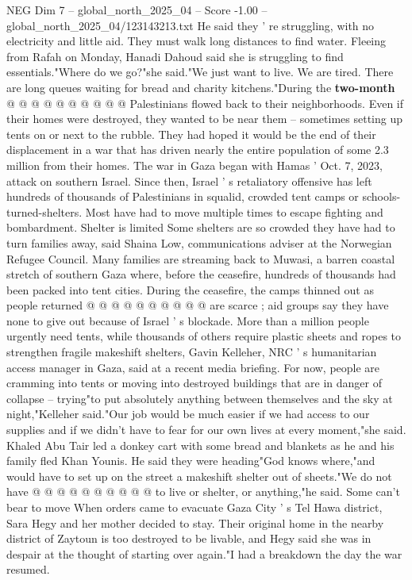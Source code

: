 \begin{textsample}{NEG Dim 7 – global\_north\_2025\_04 – Score -1.00 – global\_north\_2025\_04/123143213.txt}
He said they ' re struggling, with no electricity and little aid.
They must walk long distances to find water.
Fleeing from Rafah on Monday, Hanadi Dahoud said she is struggling to find essentials."Where do we go?"she said."We just want to live.
We are tired.
There are long queues waiting for bread and charity kitchens."During the \textbf{two-month} @ @ @ @ @ @ @ @ @ @ Palestinians flowed back to their neighborhoods.
Even if their homes were destroyed, they wanted to be near them -- sometimes setting up tents on or next to the rubble.
They had hoped it would be the end of their displacement in a war that has driven nearly the entire population of some 2.3 million from their homes.
The war in Gaza began with Hamas ' Oct. 7, 2023, attack on southern Israel.
Since then, Israel ' s retaliatory offensive has left hundreds of thousands of Palestinians in squalid, crowded tent camps or schools-turned-shelters.
Most have had to move multiple times to escape fighting and bombardment.
Shelter is limited Some shelters are so crowded they have had to turn families away, said Shaina Low, communications adviser at the Norwegian Refugee Council.
Many families are streaming back to Muwasi, a barren coastal stretch of southern Gaza where, before the ceasefire, hundreds of thousands had been packed into tent cities.
During the ceasefire, the camps thinned out as people returned @ @ @ @ @ @ @ @ @ @ are scarce ; aid groups say they have none to give out because of Israel ' s blockade.
More than a million people urgently need tents, while thousands of others require plastic sheets and ropes to strengthen fragile makeshift shelters, Gavin Kelleher, NRC ' s humanitarian access manager in Gaza, said at a recent media briefing.
For now, people are cramming into tents or moving into destroyed buildings that are in danger of collapse -- trying"to put absolutely anything between themselves and the sky at night,"Kelleher said."Our job would be much easier if we had access to our supplies and if we didn't have to fear for our own lives at every moment,"she said.
Khaled Abu Tair led a donkey cart with some bread and blankets as he and his family fled Khan Younis.
He said they were heading"God knows where,"and would have to set up on the street a makeshift shelter out of sheets."We do not have @ @ @ @ @ @ @ @ @ @ to live or shelter, or anything,"he said.
Some can't bear to move When orders came to evacuate Gaza City ' s Tel Hawa district, Sara Hegy and her mother decided to stay.
Their original home in the nearby district of Zaytoun is too destroyed to be livable, and Hegy said she was in despair at the thought of starting over again."I had a breakdown the day the war resumed.

\end{textsample}
